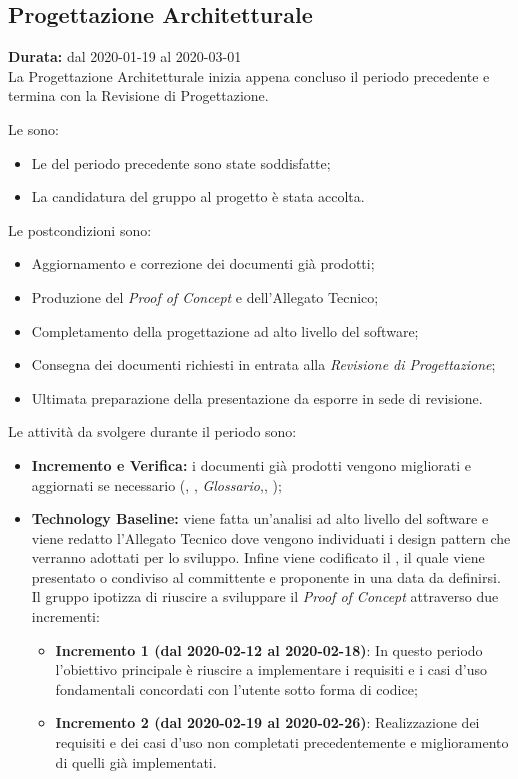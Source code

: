 \subsection{Progettazione Architetturale}
\label{progettazione_architetturale}
\textbf{Durata:} dal 2020-01-19 al 2020-03-01
\\La Progettazione Architetturale inizia appena concluso il periodo precedente e termina con la Revisione di Progettazione.

Le  sono:
\begin{itemize}
    \item Le  del periodo precedente sono state soddisfatte;
    \item La candidatura del gruppo al progetto {\NomeProgetto} è stata accolta.
\end{itemize}

Le postcondizioni sono:
\begin{itemize}
    \item Aggiornamento e correzione dei documenti già prodotti;
    \item Produzione del \textit{Proof of Concept} e dell'Allegato Tecnico;
    \item Completamento della progettazione ad alto livello del software;
    \item Consegna dei documenti richiesti in entrata alla \textit{Revisione di Progettazione};
    \item Ultimata preparazione della presentazione da esporre in sede di revisione.
\end{itemize}
Le attività da svolgere durante il periodo sono:
\begin{itemize}
    \item \textbf{Incremento e Verifica:} i documenti già prodotti vengono migliorati e aggiornati se necessario (\textit{\NdP}, \textit{\PdP}, \textit{Glossario},\textit{\PdQ}, \textit{\AdR});
    \item \textbf{Technology Baseline:} viene fatta un'analisi ad alto livello del software e viene redatto l'Allegato Tecnico dove vengono individuati i design pattern che verranno adottati per lo sviluppo. Infine viene codificato il , il quale viene presentato o condiviso al committente e proponente in una data da definirsi. Il gruppo ipotizza di riuscire a sviluppare il {\textit{Proof of Concept}} attraverso due incrementi:
    \begin{itemize}
        \item \textbf{Incremento 1 (dal 2020-02-12 al 2020-02-18)}: In questo periodo l'obiettivo principale è riuscire a implementare i requisiti e i casi d'uso fondamentali concordati con l'utente sotto forma di codice;
        \item \textbf{Incremento 2 (dal 2020-02-19 al 2020-02-26)}: Realizzazione dei requisiti e dei casi d'uso non completati precedentemente e miglioramento di quelli già implementati.
    \end{itemize}
\end{itemize}


